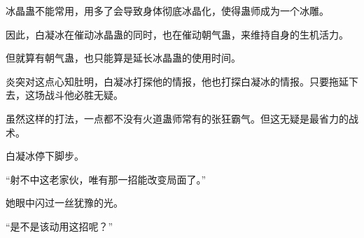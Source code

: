 \begin{this_body}
冰晶蛊不能常用，用多了会导致身体彻底冰晶化，使得蛊师成为一个冰雕。

因此，白凝冰在催动冰晶蛊的同时，也在催动朝气蛊，来维持自身的生机活力。

但就算有朝气蛊，也只能算是延长冰晶蛊的使用时间。

炎突对这点心知肚明，白凝冰打探他的情报，他也打探白凝冰的情报。只要拖延下去，这场战斗他必胜无疑。

虽然这样的打法，一点都不没有火道蛊师常有的张狂霸气。但这无疑是最省力的战术。

白凝冰停下脚步。

“射不中这老家伙，唯有那一招能改变局面了。”

她眼中闪过一丝犹豫的光。

“是不是该动用这招呢？”

\end{this_body}

